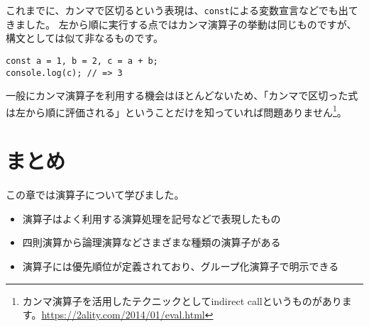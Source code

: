 これまでに、カンマで区切るという表現は、\texttt{const}による変数宣言などでも出てきました。
左から順に実行する点ではカンマ演算子の挙動は同じものですが、構文としては似て非なるものです。

\begin{lstlisting}
const a = 1, b = 2, c = a + b;
console.log(c); // => 3
\end{lstlisting}

一般にカンマ演算子を利用する機会はほとんどないため、「カンマで区切った式は左から順に評価される」ということだけを知っていれば問題ありません\footnote{カンマ演算子を活用したテクニックとしてindirect
  callというものがあります。\url{https://2ality.com/2014/01/eval.html}}。

\hypertarget{conclusion}{%
\section{まとめ}\label{conclusion}}

この章では演算子について学びました。

\begin{itemize}
\item
  演算子はよく利用する演算処理を記号などで表現したもの
\item
  四則演算から論理演算などさまざまな種類の演算子がある
\item
  演算子には優先順位が定義されており、グループ化演算子で明示できる
\end{itemize}
